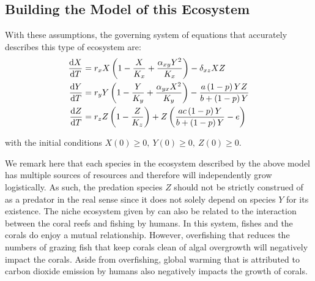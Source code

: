 \subsection{Building the Model of this Ecosystem}\label{subsec:building-the-model-of-this-ecosystem}
With these assumptions, the governing system of equations that accurately describes this type of ecosystem are:
\begin{subequations}\label{model:rayla-ephraim-d}
    \begin{align}
        \diff[]{X}{T} &= r_xX\left(1-\frac{X}{K_x}+\frac{\alpha_{xy}Y^2}{K_x}\right)-\delta_{xz}XZ
        \label{eq:rayla-ephraim-d-x}\\
        \diff[]{Y}{T} &= r_yY\left(1-\frac{Y}{K_y}+\frac{\alpha_{yx}X^2}{K_y}\right)-\frac{a\left(1-p\right)YZ}{b+\left(1-p\right)Y}
        \label{eq:rayla-ephraim-d-y}\\
        \diff[]{Z}{T} &= r_zZ\left(1-\frac{Z}{K_z}\right)+Z\left(\frac{ac\left(1-p\right)Y}{b+\left(1-p\right)Y}-e\right)
        \label{eq:rayla-ephraim-d-z}
    \end{align}
\end{subequations}

with the initial conditions $X(0)\geq 0,\ Y(0)\geq 0,\ Z(0)\geq 0$. 

We remark here that each species in the ecosystem described by the above model has multiple sources of resources and therefore will independently grow logistically. As such, the predation species $Z$ should not be strictly construed of as a predator in the real sense since it does not solely depend on species $Y$ for its existence. The niche ecosystem given by  can also be related to the interaction between the coral reefs and fishing by humans. In this system, fishes and the corals do enjoy a mutual relationship. However, overfishing that reduces the numbers of grazing fish that keep corals clean of algal overgrowth will negatively impact the corals. Aside from overfishing, global warming that is attributed to carbon dioxide emission by humans also negatively impacts the growth of corals.

